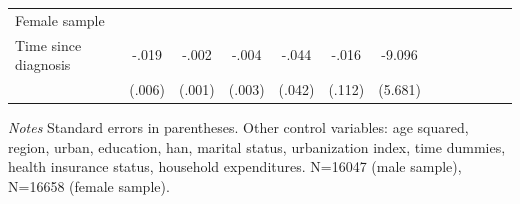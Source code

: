\begin{table}[p]
\begin{adjustbox}{max width=\linewidth}
\begin{threeparttable}
{\begin{tabular}{l*{6}{S
S}}
Female sample &&&&&&\\
Time since diagnosis&  -.019\sym{***}&    -.002         &    -.004         &    -.044         &    -.016         &   -9.096         \\
                &   (.006)         &   (.001)         &   (.003)         &   (.042)         &   (.112)         &  (5.681)         \\          
\bottomrule
\end{tabular}
\begin{tablenotes}
\item \textit{Notes}   Standard errors in parentheses.
Other control variables: age squared, region, urban, education, han, marital status, urbanization index, time dummies, health insurance status, household expenditures. N=16047 (male sample), N=16658 (female sample).
\end{tablenotes}
}
\end{threeparttable}
\end{adjustbox}
\end{table}

\clearpage


